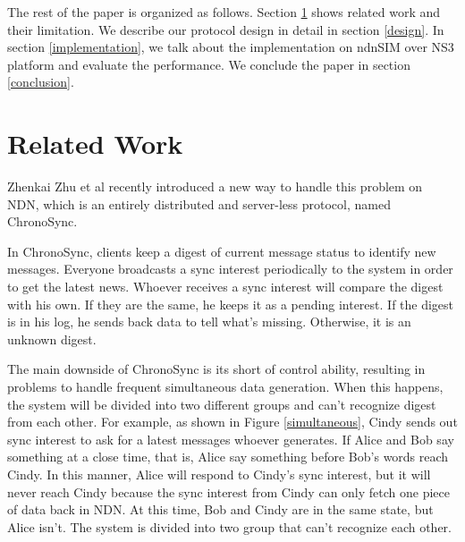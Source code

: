 \documentclass[conference]{IEEEtran}
\begin{document}
The rest of the paper is organized as follows.
Section \ref{related_work}
shows related work and their limitation.
We describe our protocol design in detail in section \ref{design}.
In section \ref{implementation},
we talk about the implementation on ndnSIM over NS3 platform and evaluate the performance.
We conclude the paper in section \ref{conclusion}.

\section{Related Work}
\label{related_work}
Zhenkai Zhu et al recently introduced a new way to handle this problem on NDN,
which is an entirely distributed and server-less protocol, named ChronoSync.

In ChronoSync, clients keep a digest of current message status to identify new messages.
Everyone broadcasts a sync interest periodically to the system in order to get the latest news.
Whoever receives a sync interest will compare the digest with his own.
If they are the same, he keeps it as a pending interest.
If the digest is in his log, he sends back data to tell what's missing.
Otherwise, it is an unknown digest.

The main downside of ChronoSync is its short of control ability,
resulting in problems to handle frequent simultaneous data generation.
When this happens, the system will be divided into two different groups and can't recognize digest from each other.
For example, as shown in Figure \ref{simultaneous},
Cindy sends out sync interest to ask for a latest messages whoever generates.
If Alice and Bob say something at a close time, that is,
Alice say something before Bob's words reach Cindy.
In this manner, Alice will respond to Cindy's sync interest,
but it will never reach Cindy because the sync interest from Cindy can only fetch one piece of data back in NDN.
At this time, Bob and Cindy are in the same state, but Alice isn't.
The system is divided into two group that can't recognize each other.
\end{document}
